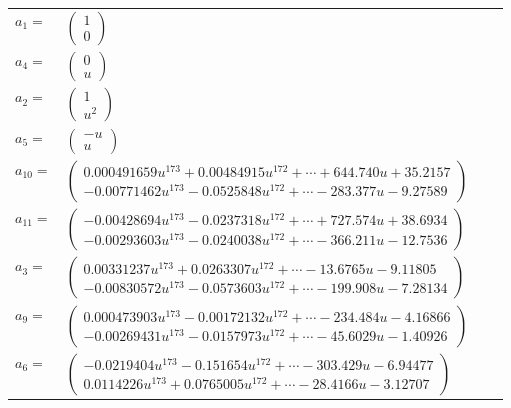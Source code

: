 \documentclass[1p]{elsarticle_modified}
\theoremstyle{definition}
\begin{document}
\begin{tabular}{m{7pt} m{180pt} m{7pt} m{180pt} }
\flushright $a_{1}=$&$\begin{pmatrix}1\\0\end{pmatrix}$ \\
\flushright $a_{4}=$&$\begin{pmatrix}0\\u\end{pmatrix}$ \\
\flushright $a_{2}=$&$\begin{pmatrix}1\\u^2\end{pmatrix}$ \\
\flushright $a_{5}=$&$\begin{pmatrix}- u\\u\end{pmatrix}$ \\
\flushright $a_{10}=$&$\begin{pmatrix}0.000491659 u^{173}+0.00484915 u^{172}+\cdots+644.740 u+35.2157\\-0.00771462 u^{173}-0.0525848 u^{172}+\cdots-283.377 u-9.27589\end{pmatrix}$ \\
\flushright $a_{11}=$&$\begin{pmatrix}-0.00428694 u^{173}-0.0237318 u^{172}+\cdots+727.574 u+38.6934\\-0.00293603 u^{173}-0.0240038 u^{172}+\cdots-366.211 u-12.7536\end{pmatrix}$ \\
\flushright $a_{3}=$&$\begin{pmatrix}0.00331237 u^{173}+0.0263307 u^{172}+\cdots-13.6765 u-9.11805\\-0.00830572 u^{173}-0.0573603 u^{172}+\cdots-199.908 u-7.28134\end{pmatrix}$ \\
\flushright $a_{9}=$&$\begin{pmatrix}0.000473903 u^{173}-0.00172132 u^{172}+\cdots-234.484 u-4.16866\\-0.00269431 u^{173}-0.0157973 u^{172}+\cdots-45.6029 u-1.40926\end{pmatrix}$ \\
\flushright $a_{6}=$&$\begin{pmatrix}-0.0219404 u^{173}-0.151654 u^{172}+\cdots-303.429 u-6.94477\\0.0114226 u^{173}+0.0765005 u^{172}+\cdots-28.4166 u-3.12707\end{pmatrix}$ \\

\end{tabular}
\end{document}

